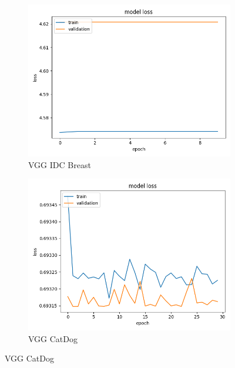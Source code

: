 \begin{figure}[h]
\begin{subfigure}[b]{.45\linewidth}
\includegraphics[width=\linewidth]{Figs/vgg_breast_loss.jpg}
\caption{VGG IDC Breast}
\end{subfigure}
\begin{subfigure}[b]{.45\linewidth}
\includegraphics[width=\linewidth]{Figs/vgg_catdog_loss.jpg}
\caption{VGG CatDog}
\end{subfigure}


\end{figure}
